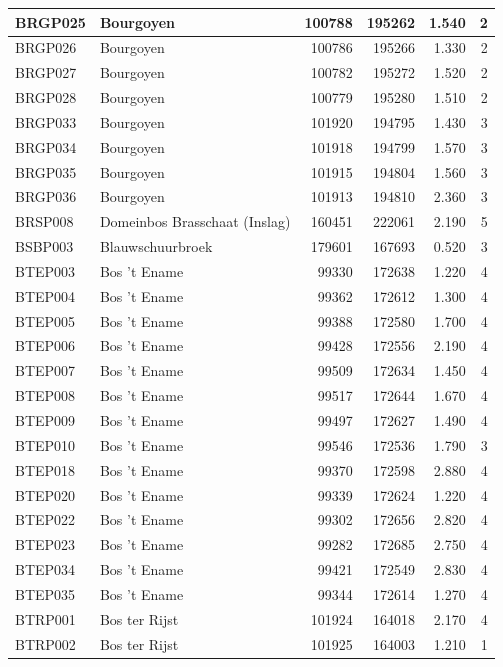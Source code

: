 \documentclass[11pt,]{book}
\begin{document}
\begin{table}
\begin{tabular}[t]{l|l|r|r|r|r}
\hline
BRGP025 & Bourgoyen & 100788 & 195262 & 1.540 & 2\\
\hline
BRGP026 & Bourgoyen & 100786 & 195266 & 1.330 & 2\\
\hline
BRGP027 & Bourgoyen & 100782 & 195272 & 1.520 & 2\\
\hline
BRGP028 & Bourgoyen & 100779 & 195280 & 1.510 & 2\\
\hline
BRGP033 & Bourgoyen & 101920 & 194795 & 1.430 & 3\\
\hline
BRGP034 & Bourgoyen & 101918 & 194799 & 1.570 & 3\\
\hline
BRGP035 & Bourgoyen & 101915 & 194804 & 1.560 & 3\\
\hline
BRGP036 & Bourgoyen & 101913 & 194810 & 2.360 & 3\\
\hline
BRSP008 & Domeinbos Brasschaat (Inslag) & 160451 & 222061 & 2.190 & 5\\
\hline
BSBP003 & Blauwschuurbroek & 179601 & 167693 & 0.520 & 3\\
\hline
BTEP003 & Bos 't Ename & 99330 & 172638 & 1.220 & 4\\
\hline
BTEP004 & Bos 't Ename & 99362 & 172612 & 1.300 & 4\\
\hline
BTEP005 & Bos 't Ename & 99388 & 172580 & 1.700 & 4\\
\hline
BTEP006 & Bos 't Ename & 99428 & 172556 & 2.190 & 4\\
\hline
BTEP007 & Bos 't Ename & 99509 & 172634 & 1.450 & 4\\
\hline
BTEP008 & Bos 't Ename & 99517 & 172644 & 1.670 & 4\\
\hline
BTEP009 & Bos 't Ename & 99497 & 172627 & 1.490 & 4\\
\hline
BTEP010 & Bos 't Ename & 99546 & 172536 & 1.790 & 3\\
\hline
BTEP018 & Bos 't Ename & 99370 & 172598 & 2.880 & 4\\
\hline
BTEP020 & Bos 't Ename & 99339 & 172624 & 1.220 & 4\\
\hline
BTEP022 & Bos 't Ename & 99302 & 172656 & 2.820 & 4\\
\hline
BTEP023 & Bos 't Ename & 99282 & 172685 & 2.750 & 4\\
\hline
BTEP034 & Bos 't Ename & 99421 & 172549 & 2.830 & 4\\
\hline
BTEP035 & Bos 't Ename & 99344 & 172614 & 1.270 & 4\\
\hline
BTRP001 & Bos ter Rijst & 101924 & 164018 & 2.170 & 4\\
\hline
BTRP002 & Bos ter Rijst & 101925 & 164003 & 1.210 & 1\\

\end{tabular}
\end{table}
\end{document}
